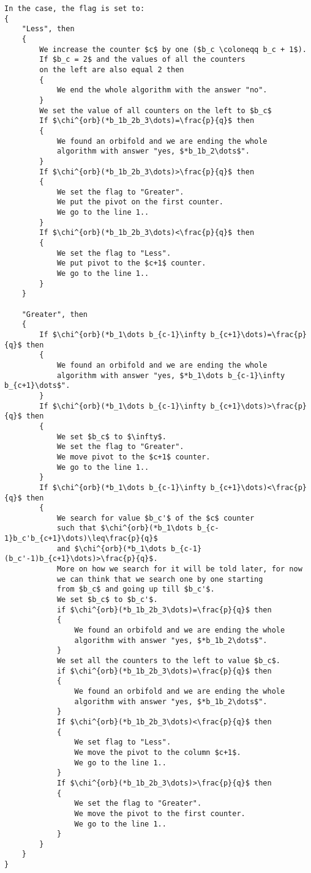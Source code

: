 \begin{lstlisting}[firstnumber=1,consecutivenumbers=true]
In the case, the flag is set to: 
{
    "Less", then 
    {
        We increase the counter $c$ by one ($b_c \coloneqq b_c + 1$).
        If $b_c = 2$ and the values of all the counters 
        on the left are also equal 2 then 
        {
            We end the whole algorithm with the answer "no".
        }
        We set the value of all counters on the left to $b_c$
        If $\chi^{orb}(*b_1b_2b_3\dots)=\frac{p}{q}$ then
        {
            We found an orbifold and we are ending the whole
            algorithm with answer "yes, $*b_1b_2\dots$".
        }
        If $\chi^{orb}(*b_1b_2b_3\dots)>\frac{p}{q}$ then  
        {
            We set the flag to "Greater".
            We put the pivot on the first counter. 
            We go to the line 1..
        } 
        If $\chi^{orb}(*b_1b_2b_3\dots)<\frac{p}{q}$ then
        {
            We set the flag to "Less".
            We put pivot to the $c+1$ counter.
            We go to the line 1..
        } 
    }

    "Greater", then
    {
        If $\chi^{orb}(*b_1\dots b_{c-1}\infty b_{c+1}\dots)=\frac{p}{q}$ then
        {
            We found an orbifold and we are ending the whole
            algorithm with answer "yes, $*b_1\dots b_{c-1}\infty b_{c+1}\dots$".
        } 
        If $\chi^{orb}(*b_1\dots b_{c-1}\infty b_{c+1}\dots)>\frac{p}{q}$ then
        {
            We set $b_c$ to $\infty$.
            We set the flag to "Greater".
            We move pivot to the $c+1$ counter.
            We go to the line 1..
        }  
        If $\chi^{orb}(*b_1\dots b_{c-1}\infty b_{c+1}\dots)<\frac{p}{q}$ then
        {
            We search for value $b_c'$ of the $c$ counter 
            such that $\chi^{orb}(*b_1\dots b_{c-1}b_c'b_{c+1}\dots)\leq\frac{p}{q}$ 
            and $\chi^{orb}(*b_1\dots b_{c-1}(b_c'-1)b_{c+1}\dots)>\frac{p}{q}$.
            More on how we search for it will be told later, for now  
            we can think that we search one by one starting 
            from $b_c$ and going up till $b_c'$.
            We set $b_c$ to $b_c'$.
            if $\chi^{orb}(*b_1b_2b_3\dots)=\frac{p}{q}$ then 
            {
                We found an orbifold and we are ending the whole
                algorithm with answer "yes, $*b_1b_2\dots$".
            }
            We set all the counters to the left to value $b_c$.
            if $\chi^{orb}(*b_1b_2b_3\dots)=\frac{p}{q}$ then 
            {
                We found an orbifold and we are ending the whole
                algorithm with answer "yes, $*b_1b_2\dots$".
            }
            If $\chi^{orb}(*b_1b_2b_3\dots)<\frac{p}{q}$ then 
            {
                We set flag to "Less".
                We move the pivot to the column $c+1$.
                We go to the line 1..
            }
            If $\chi^{orb}(*b_1b_2b_3\dots)>\frac{p}{q}$ then 
            {
                We set the flag to "Greater".
                We move the pivot to the first counter.
                We go to the line 1..
            }
        }  
    }
}
\end{lstlisting}
